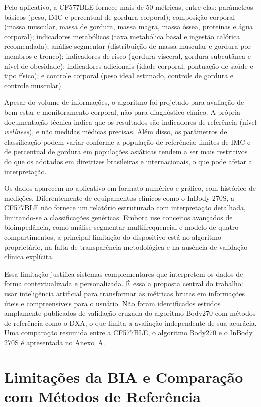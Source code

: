Pelo aplicativo, a CF577BLE fornece mais de 50 métricas, entre elas: parâmetros básicos
(peso, IMC e percentual de gordura corporal); composição corporal (massa muscular, massa
de gordura, massa magra, massa óssea, proteínas e água corporal); indicadores metabólicos
(taxa metabólica basal e ingestão calórica recomendada); análise segmentar (distribuição
de massa muscular e gordura por membros e tronco); indicadores de risco (gordura
visceral, gordura subcutânea e nível de obesidade); indicadores adicionais (idade
corporal, pontuação de saúde e tipo físico); e controle corporal (peso ideal estimado,
controle de gordura e controle muscular).

Apesar do volume de informações, o algoritmo foi projetado para avaliação de bem-estar e
monitoramento corporal, não para diagnóstico clínico. A própria documentação técnica
indica que os resultados são indicadores de referência (nível \emph{wellness}), e não
medidas médicas precisas. Além disso, os parâmetros de classificação podem variar
conforme a população de referência: limites de IMC e de percentual de gordura em
populações asiáticas tendem a ser mais restritivos do que os adotados em diretrizes
brasileiras e internacionais, o que pode afetar a interpretação.

Os dados aparecem no aplicativo em formato numérico e gráfico, com histórico de medições.
Diferentemente de equipamentos clínicos como o InBody 270S, a CF577BLE não fornece um
relatório estruturado com interpretação detalhada, limitando-se a classificações
genéricas. Embora use conceitos avançados de bioimpedância, como análise segmentar
multifrequencial e modelo de quatro compartimentos, a principal limitação do dispositivo
está no algoritmo proprietário, na falta de transparência metodológica e na ausência de
validação clínica explícita.

Essa limitação justifica sistemas complementares que interpretem os dados de forma
contextualizada e personalizada. É essa a proposta central do trabalho: usar
inteligência artificial para transformar as métricas brutas em informações úteis e
compreensíveis para o usuário. Não foram identificados estudos amplamente publicados de
validação cruzada do algoritmo Body270 com métodos de referência como o DXA, o que limita
a avaliação independente de sua acurácia. Uma comparação resumida entre a CF577BLE, o
algoritmo Body270 e o InBody 270S é apresentada no Anexo~A.

\section{Limitações da BIA e Comparação com Métodos de Referência}


